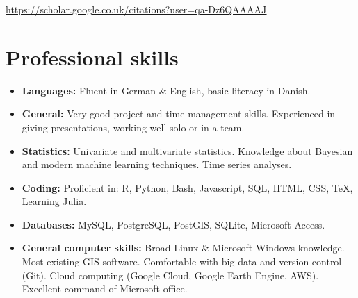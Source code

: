 \documentclass[12pt,a4paper,roman]{moderncv}        %
\begin{document}
\vspace{6pt}

\faGraduationCap \hspace{1pt}
\underline{
    \href{https://scholar.google.co.uk/citations?user=qa-Dz6QAAAAJ}{https://scholar.google.co.uk/citations?user=qa-Dz6QAAAAJ}
}
\section{Professional skills}

\vspace{6pt}

\begin{itemize}

\item \textbf{Languages:} Fluent in German \& English, basic literacy in Danish.
\item \textbf{General:} Very good project and time management skills. Experienced in giving presentations, working well solo or in a team.
\item \textbf{Statistics:} Univariate and multivariate statistics. Knowledge about Bayesian and modern machine learning techniques. Time series analyses.
\item \textbf{Coding:} Proficient in: R, Python, Bash, Javascript, SQL, HTML, CSS, TeX, Learning Julia.
\item \textbf{Databases:} MySQL, PostgreSQL, PostGIS, SQLite, Microsoft Access.
\item \textbf{General computer skills:} Broad Linux \& Microsoft Windows knowledge. Most existing GIS software. Comfortable with big data and version control (Git). Cloud computing (Google Cloud, Google Earth Engine, AWS). Excellent command of Microsoft office.

\end{itemize}


\end{document}
